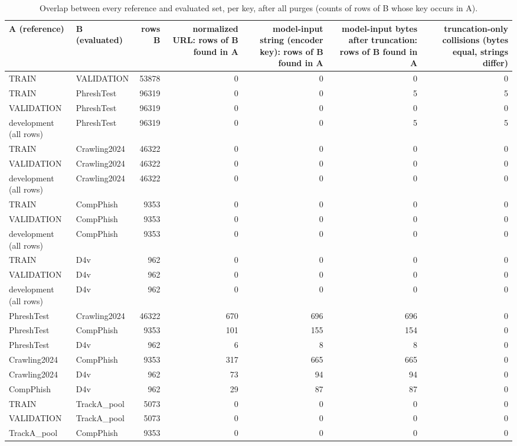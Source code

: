 \begin{table}[t]
\centering
\scriptsize
\caption{Overlap between every reference and evaluated set, per key, after all purges (counts of rows of B whose key occurs in A).}
\label{tab:rev_R5_overlap_by_key_all_pairs}
\begin{tabular}{llrrrrr}
\toprule
A (reference) & B (evaluated) & rows B & normalized URL: rows of B found in A & model-input string (encoder key): rows of B found in A & model-input bytes after truncation: rows of B found in A & truncation-only collisions (bytes equal, strings differ) \\
\midrule
TRAIN & VALIDATION & 53878 & 0 & 0 & 0 & 0 \\
TRAIN & PhreshTest & 96319 & 0 & 0 & 5 & 5 \\
VALIDATION & PhreshTest & 96319 & 0 & 0 & 0 & 0 \\
development (all rows) & PhreshTest & 96319 & 0 & 0 & 5 & 5 \\
TRAIN & Crawling2024 & 46322 & 0 & 0 & 0 & 0 \\
VALIDATION & Crawling2024 & 46322 & 0 & 0 & 0 & 0 \\
development (all rows) & Crawling2024 & 46322 & 0 & 0 & 0 & 0 \\
TRAIN & CompPhish & 9353 & 0 & 0 & 0 & 0 \\
VALIDATION & CompPhish & 9353 & 0 & 0 & 0 & 0 \\
development (all rows) & CompPhish & 9353 & 0 & 0 & 0 & 0 \\
TRAIN & D4v & 962 & 0 & 0 & 0 & 0 \\
VALIDATION & D4v & 962 & 0 & 0 & 0 & 0 \\
development (all rows) & D4v & 962 & 0 & 0 & 0 & 0 \\
PhreshTest & Crawling2024 & 46322 & 670 & 696 & 696 & 0 \\
PhreshTest & CompPhish & 9353 & 101 & 155 & 154 & 0 \\
PhreshTest & D4v & 962 & 6 & 8 & 8 & 0 \\
Crawling2024 & CompPhish & 9353 & 317 & 665 & 665 & 0 \\
Crawling2024 & D4v & 962 & 73 & 94 & 94 & 0 \\
CompPhish & D4v & 962 & 29 & 87 & 87 & 0 \\
TRAIN & TrackA\_pool & 5073 & 0 & 0 & 0 & 0 \\
VALIDATION & TrackA\_pool & 5073 & 0 & 0 & 0 & 0 \\
TrackA\_pool & CompPhish & 9353 & 0 & 0 & 0 & 0 \\

\end{tabular}
\end{table}
